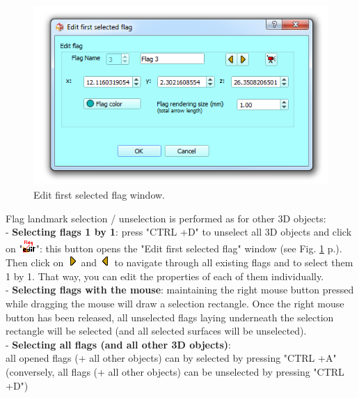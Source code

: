 \documentclass[12pt, a4paper]{book}
\begin{document}
\begin{figure}
  \centering
  \includegraphics[scale=0.55]{../images/06/objects/edit_flag.png} 
	\caption{Edit first selected flag window.}
\label{first_flag_edit}
\end{figure}


Flag landmark selection / unselection is performed as for other 3D objects:\\
- \textbf{Selecting flags 1 by 1}: press "CTRL +D" to unselect all 3D objects and click on "\includegraphics[scale=0.7]{../images/06/objects/flag_edit.png}": this button opens the "Edit first selected flag" window (see Fig. \ref{first_flag_edit} p.\pageref{first_flag_edit}). Then click on \includegraphics[scale=0.7]{../images/06/objects/s_right.png} and \includegraphics[scale=0.7]{../images/06/objects/s_left.png} to navigate through all existing flags and to select them 1 by 1. That way, you can edit the properties of each of them individually.\\
- \textbf{Selecting flags with the mouse}: maintaining the right mouse button pressed while dragging the mouse will draw a selection rectangle. Once the right mouse button has been released, all unselected flags laying underneath the selection rectangle will be selected (and all selected surfaces will be unselected).\\
- \textbf{Selecting all flags (and all other 3D objects)}:\\all opened flags (+ all other objects) can by selected by pressing "CTRL +A" (conversely, all flags (+ all other objects) can be unselected by pressing "CTRL +D")\\
\end{document}

